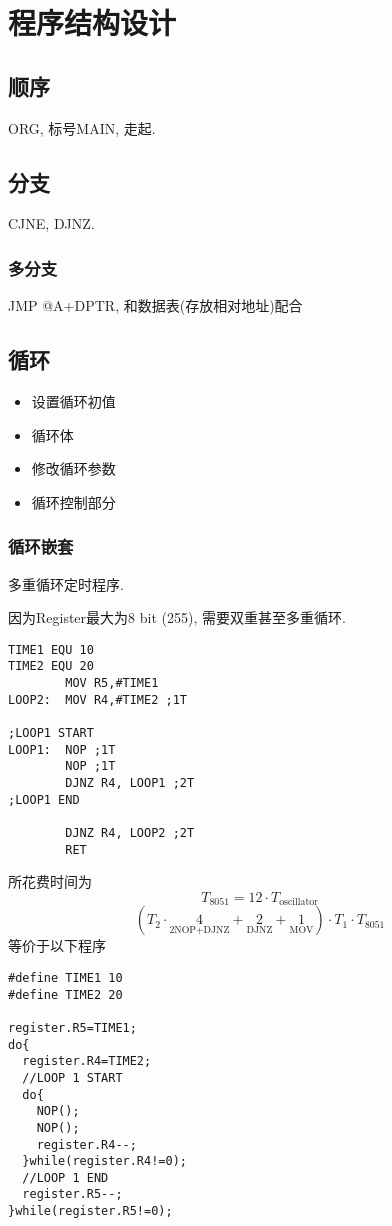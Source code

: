 \documentclass[a4paper]{report}
\begin{document}
\chapter{程序结构设计}
\section{顺序}
ORG, 标号MAIN, 走起. 
\section{分支}
CJNE, DJNZ. 

\subsection{多分支}
JMP @A+DPTR, 和数据表(存放相对地址)配合
\section{循环}
\begin{itemize}
  \item 设置循环初值
  \item 循环体
  \item 修改循环参数
  \item 循环控制部分
\end{itemize}
\subsection{循环嵌套}
多重循环定时程序.

因为Register最大为8 bit (255), 需要双重甚至多重循环. 

\begin{verbatim}
TIME1 EQU 10
TIME2 EQU 20
        MOV R5,#TIME1
LOOP2:  MOV R4,#TIME2 ;1T

;LOOP1 START
LOOP1:  NOP ;1T
        NOP ;1T
        DJNZ R4, LOOP1 ;2T
;LOOP1 END

        DJNZ R4, LOOP2 ;2T
        RET
\end{verbatim}
所花费时间为
\begin{equation}
  T_{8051}=12\cdot T_{\text{oscillator}}
\end{equation}
\begin{equation}
  (T_2\cdot \underset{\text{2NOP+DJNZ}}{4}+\underset{\text{DJNZ}}{2}+\underset{\text{MOV}}{1})\cdot T_1\cdot T_{8051}
\end{equation}
等价于以下程序
\begin{verbatim}
#define TIME1 10
#define TIME2 20

register.R5=TIME1;
do{
  register.R4=TIME2;
  //LOOP 1 START
  do{
    NOP();
    NOP();
    register.R4--;
  }while(register.R4!=0);
  //LOOP 1 END
  register.R5--;
}while(register.R5!=0);
\end{verbatim}
\end{document}
